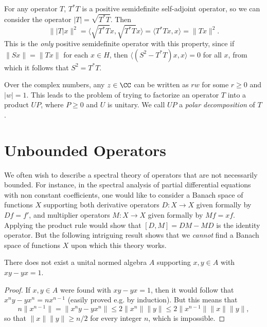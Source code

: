For any operator $T$, $T^*T$ is a positive semidefinite self-adjoint operator, so we can consider the operator $|T| = \sqrt{T^*T}$. Then
%
\[ \| |T| x \|^2 = \langle \sqrt{T^* T} x, \sqrt{T^* T} x \rangle = \langle T^*T x, x \rangle = \| Tx \|^2. \]
%
This is the \emph{only} positive semidefinite operator with this property, since if $\| Sx \| = \| Tx \|$ for each $x \in H$, then $\langle (S^2 - T^* T) x, x \rangle = 0$ for all $x$, from which it follows that $S^2 = T^*T$.

Over the complex numbers, any $z \in \CC$ can be written as $r w$ for some $r \geq 0$ and $|w| = 1$. This leads to the problem of trying to factorize an operator $T$ into a product $U P$, where $P \geq 0$ and $U$ is unitary. We call $UP$ a \emph{polar decomposition} of $T$.




















\chapter{Unbounded Operators}

We often wish to describe a spectral theory of operators that are not necessarily bounded. For instance, in the spectral analysis of partial differential equations with non constant coefficients, one would like to consider a Banach space of functions $X$ supporting both derivative operators $D: X \to X$ given formally by $Df = f'$, and multiplier operators $M: X \to X$ given formally by $Mf = xf$. Applying the product rule would show that $[D,M] = DM - MD$ is the identity operator. But the following intriguing result shows that we \emph{cannot} find a Banach space of functions $X$ upon which this theory works.

\begin{lemma}
    There does not exist a unital normed algebra $A$ supporting $x,y \in A$ with $xy - yx = 1$.
\end{lemma}
\begin{proof}
    If $x,y \in A$ were found with $xy - yx = 1$, then it would follow that $x^n y - yx^n = nx^{n-1}$ (easily proved e.g. by induction). But this means that
    \[ n \| x^{n-1} \| = \| x^n y - yx^n \| \leq 2 \| x^n \| \| y \| \leq 2 \| x^{n-1} \| \| x \| \| y \|, \]
    so that $\| x \| \| y \| \geq n/2$ for every integer $n$, which is impossible.
\end{proof}


